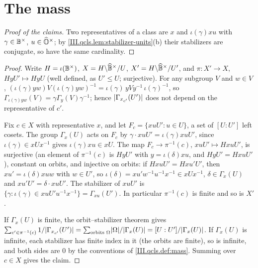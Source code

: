 \section{The mass}\label{sec:qcls-mass}

\begin{definition}[mass]
\end{definition}
\begin{proof}[Proof of the claims]
Two representatives of a class are $x$ and $\iota(\gamma)xu$ with $\gamma\in\mathbb{B}^\times$, $u\in\widehat{\mathbb{O}}^\times$; by
\cref{III.qcls.lem:stabilizer-units}(b) their stabilizers are conjugate, so have the same cardinality.
\end{proof}

\begin{lemma}
\end{lemma}
\begin{proof}
Write $H=\iota(\mathbb{B}^\times)$, $X=H\backslash\widehat{\mathbb{B}}^\times/U$, $X'=H\backslash\widehat{\mathbb{B}}^\times/U'$, and $\pi\colon X'\to X$, $Hy U'\mapsto HyU$ (well defined, as
$U'\le U$; surjective). For any subgroup $V$ and $w\in V$, $(\iota(\gamma)yw)V(\iota(\gamma)yw)^{-1}=\iota(\gamma)\,yVy^{-1}\,\iota(\gamma)^{-1}$, so
$\Gamma_{\iota(\gamma)yw}(V)=\gamma\Gamma_y(V)\gamma^{-1}$; hence $\lvert\Gamma_{x_{c'}}(U')\rvert$ does not depend on the representative of $c'$.

Fix $c\in X$ with representative $x$, and let $F_c=\{xuU':u\in U\}$, a set of $[U:U']$ left cosets. The group $\Gamma_x(U)$ acts on $F_c$ by
$\gamma\cdot xuU'=\iota(\gamma)xuU'$, since $\iota(\gamma)\in xUx^{-1}$ gives $\iota(\gamma)xu\in xU$. The map $F_c\to\pi^{-1}(c)$, $xuU'\mapsto HxuU'$, is
surjective (an element of $\pi^{-1}(c)$ is $HyU'$ with $y=\iota(\delta)xu$, and $HyU'=HxuU'$), constant on orbits, and injective on orbits: if
$HxuU'=Hxu'U'$, then $xu'=\iota(\delta)xuw$ with $w\in U'$, so $\iota(\delta)=xu'w^{-1}u^{-1}x^{-1}\in xUx^{-1}$, $\delta\in\Gamma_x(U)$ and
$xu'U'=\delta\cdot xuU'$. The stabilizer of $xuU'$ is $\{\gamma:\iota(\gamma)\in xuU'u^{-1}x^{-1}\}=\Gamma_{xu}(U')$. In particular $\pi^{-1}(c)$ is finite and
so is $X'$.

If $\Gamma_x(U)$ is finite, the orbit--stabilizer theorem gives
$\sum_{c'\in\pi^{-1}(c)}1/\lvert\Gamma_{x_{c'}}(U')\rvert=\sum_{\text{orbits }\Omega}\lvert\Omega\rvert/\lvert\Gamma_x(U)\rvert=[U:U']/\lvert\Gamma_x(U)\rvert$. If $\Gamma_x(U)$ is
infinite, each stabilizer has finite index in it (the orbits are finite), so is infinite, and both sides are $0$ by the conventions of
\cref{III.qcls.def:mass}. Summing over $c\in X$ gives the claim.
\end{proof}

